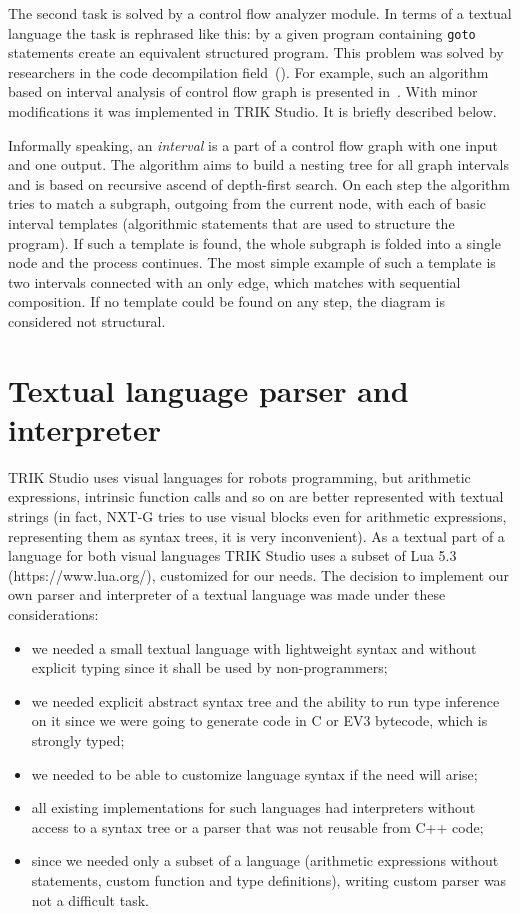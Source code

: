 \documentclass[conference]{IEEEtran}
\begin{document}
The second task is solved by a control flow analyzer module. In terms of a textual language the task is rephrased like this: by a given program containing \texttt{goto} statements create an equivalent structured program. This problem was solved by researchers in the code decompilation field~(\cite{steven1997advanced,derevenets2009structural}). For example, such an algorithm based on interval analysis of control flow graph is presented in~\cite{steven1997advanced}. With minor modifications it was implemented in TRIK Studio. It is briefly described below.

Informally speaking, an \textit{interval} is a part of a control flow graph with one input and one output. The algorithm aims to build a nesting tree for all graph intervals and is based on recursive ascend of depth-first search. On each step the algorithm tries to match a subgraph, outgoing from the current node, with each of basic interval templates (algorithmic statements that are used to structure the program). If such a template is found, the whole subgraph is folded into a single node and the process continues. The most simple example of such a template is two intervals connected with an only edge, which matches with sequential composition. If no template could be found on any step, the diagram is considered not structural. 
 
\section{Textual language parser and interpreter}
\label{chapter:parser}
TRIK Studio uses visual languages for robots programming, but arithmetic expressions, intrinsic function calls and so on are better represented with textual strings (in fact, NXT-G tries to use visual blocks even for arithmetic expressions, representing them as syntax trees, it is very inconvenient). As a textual part of a language for both visual languages TRIK Studio uses a subset of Lua 5.3 (https://www.lua.org/), customized for our needs. The decision to implement our own parser and interpreter of a textual language was made under these considerations:

\begin{itemize}
	\item we needed a small textual language with lightweight syntax and without explicit typing since it shall be used by non-programmers;
	\item we needed explicit abstract syntax tree and the ability to run type inference on it since we were going to generate code in C or EV3 bytecode, which is strongly typed;
	\item we needed to be able to customize language syntax if the need will arise;
	\item all existing implementations for such languages had interpreters without access to a syntax tree or a parser that was not reusable from C++ code;
	\item since we needed only a subset of a language (arithmetic expressions without statements, custom function and type definitions), writing custom parser was not a difficult task.
\end{itemize}
\end{document}
